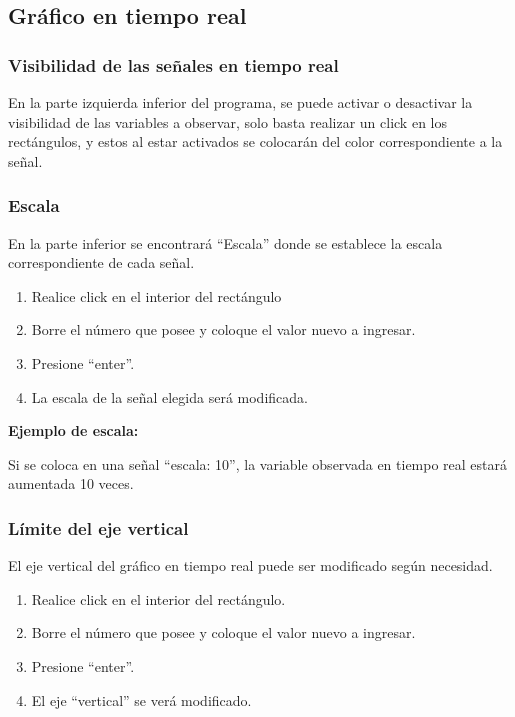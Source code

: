\subsection{Gráfico en tiempo real}
\subsubsection{	Visibilidad de las señales en tiempo real}
En la parte izquierda inferior del programa, se puede activar o desactivar la visibilidad de las variables a observar, solo basta realizar un click en los rectángulos, y estos al estar activados se colocarán del color correspondiente a la señal.

\subsubsection{Escala}
En la parte inferior se encontrará “Escala” donde se establece la escala correspondiente de cada señal.
\begin{enumerate}
	\item Realice click en el interior del rectángulo
	\item Borre el número que posee y coloque el valor nuevo a ingresar.
	\item Presione “enter”.
	\item La escala de la señal elegida será modificada.
	
\end{enumerate}

\textbf{Ejemplo de escala:}

Si se coloca en una señal “escala: 10”, la variable observada en tiempo real estará aumentada 10 veces.

\subsubsection{Límite del eje vertical}
El eje vertical del gráfico en tiempo real puede ser modificado según necesidad.

\begin{enumerate}
	\item Realice click en el interior del rectángulo.
	\item Borre el número que posee y coloque el valor nuevo a ingresar.
	\item Presione “enter”.
	\item El eje “vertical” se verá modificado.
	
\end{enumerate}


